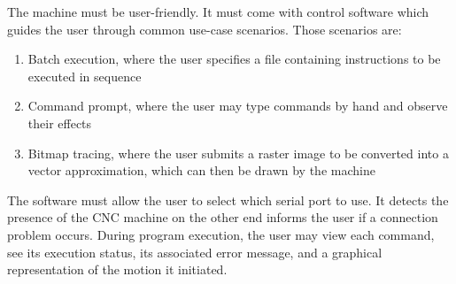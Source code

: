The machine must be user-friendly. It must come with control software which
guides the user through common use-case scenarios. Those scenarios are:
\begin{enumerate}
    \item Batch execution, where the user specifies a file containing
    instructions to be executed in sequence
    \item Command prompt, where the user may type commands by hand and observe
    their effects
    \item Bitmap tracing, where the user submits a raster image to be converted
    into a vector approximation, which can then be drawn by the machine
\end{enumerate}

The software must allow the user to select which serial port to use. It detects
the presence of the CNC machine on the other end informs the user if a
connection problem occurs. During program execution, the user may view each
command, see its execution status, its associated error message, and a graphical
representation of the motion it initiated.

